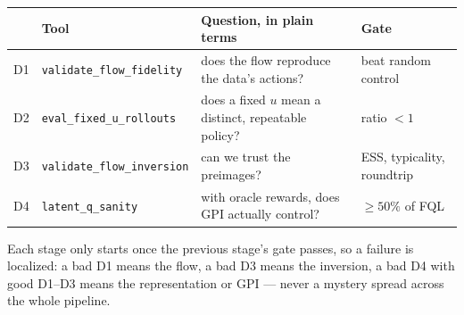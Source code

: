 \documentclass[11pt]{article}
\begin{document}
\begin{center}
\small
\begin{tabular}{@{}llp{5.9cm}l@{}}
\toprule
 & Tool & Question, in plain terms & Gate \\
\midrule
D1 & \texttt{validate\_flow\_fidelity} & does the flow reproduce the data's actions? & beat random control \\
D2 & \texttt{eval\_fixed\_u\_rollouts} & does a fixed $u$ mean a distinct, repeatable policy? & ratio $<1$ \\
D3 & \texttt{validate\_flow\_inversion} & can we trust the preimages? & ESS, typicality, roundtrip \\
D4 & \texttt{latent\_q\_sanity} & with oracle rewards, does GPI actually control? & $\ge50\%$ of FQL \\
\bottomrule
\end{tabular}
\end{center}

\noindent
Each stage only starts once the previous stage's gate passes, so a failure is localized:
a bad D1 means the flow, a bad D3 means the inversion, a bad D4 with good D1--D3 means
the representation or GPI --- never a mystery spread across the whole pipeline.
\end{document}
